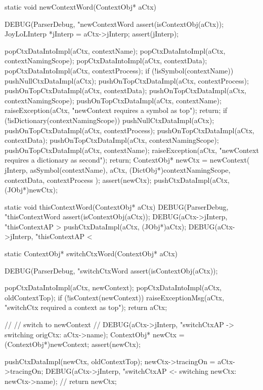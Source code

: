 \startCCode
static void newContextWord(ContextObj* aCtx) {
  DEBUG(ParserDebug, "newContextWord%
  assert(isContextObj(aCtx));
  JoyLoLInterp *jInterp = aCtx->jInterp;
  assert(jInterp);

  popCtxDataIntoImpl(aCtx, contextName);
  popCtxDataIntoImpl(aCtx, contextNamingScope);
  popCtxDataIntoImpl(aCtx, contextData);
  popCtxDataIntoImpl(aCtx, contextProcess);
  if (!isSymbol(contextName)) {
    pushNullCtxDataImpl(aCtx);
    pushOnTopCtxDataImpl(aCtx, contextProcess);
    pushOnTopCtxDataImpl(aCtx, contextData);
    pushOnTopCtxDataImpl(aCtx, contextNamingScope);
    pushOnTopCtxDataImpl(aCtx, contextName);
    raiseException(aCtx,
      "newContext requires a symbol as top");
    return;
  }
  if (!isDictionary(contextNamingScope)) {
    pushNullCtxDataImpl(aCtx);
    pushOnTopCtxDataImpl(aCtx, contextProcess);
    pushOnTopCtxDataImpl(aCtx, contextData);
    pushOnTopCtxDataImpl(aCtx, contextNamingScope);
    pushOnTopCtxDataImpl(aCtx, contextName);
    raiseException(aCtx,
      "newContext requires a dictionary as second");
    return;
  }
  ContextObj* newCtx = newContext(
    jInterp,
    asSymbol(contextName),
    aCtx,
    (DictObj*)contextNamingScope,
    contextData,
    contextProcess
  );
  assert(newCtx);
  pushCtxDataImpl(aCtx, (JObj*)newCtx);
}
\stopCCode

\startCCode
static void thisContextWord(ContextObj* aCtx) {
  DEBUG(ParserDebug, "thisContextWord%
  assert(isContextObj(aCtx));
  DEBUG(aCtx->jInterp, "thisContextAP > %
  pushCtxDataImpl(aCtx, (JObj*)aCtx);
  DEBUG(aCtx->jInterp, "thisContextAP < %
}
\stopCCode

\startCCode
static ContextObj* switchCtxWord(ContextObj* aCtx) {
  DEBUG(ParserDebug, "switchCtxWord%
  assert(isContextObj(aCtx));

  popCtxDataIntoImpl(aCtx, newContext);
  popCtxDataIntoImpl(aCtx, oldContextTop);
  if (!isContext(newContext)) {
    raiseExceptionMsg(aCtx,
      "switchCtx required a context as top");
    return aCtx;
  }
  
  //
  // switch to newContext
  //
  DEBUG(aCtx->jInterp, "switchCtxAP -> switching origCtx: %
    aCtx->name);
  ContextObj* newCtx = (ContextObj*)newContext;
  assert(newCtx);

  pushCtxDataImpl(newCtx, oldContextTop);
  newCtx->tracingOn = aCtx->tracingOn;
  DEBUG(aCtx->jInterp, "switchCtxAP <- switching newCtx: %
            newCtx->name);
  //
  return newCtx;
}
\stopCCode

